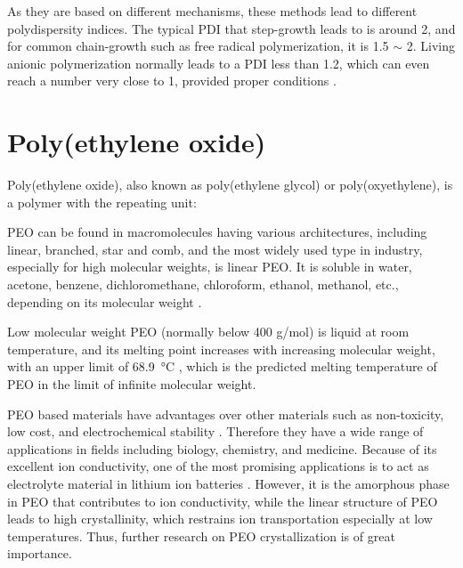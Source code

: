 As they are based on different mechanisms, these methods lead to different polydispersity indices. The typical PDI that step-growth leads to is around 2, and for common chain-growth such as free radical polymerization, it is 1.5 $\sim$ 2. Living anionic polymerization normally leads to a PDI less than 1.2, which can even reach a number very close to 1, provided proper conditions \cite{Dotson1995}.

\section{Poly(ethylene oxide)}

Poly(ethylene oxide), also known as poly(ethylene glycol) or poly(oxyethylene), is a polymer with the repeating unit:

\begin{center}
\def\setpolymerdelim#1#2{%
	\def\delimleft{#1}%
	\def\delimright{#2}%
}

\def\makebraces[#1,#2]#3#4#5{%
	\edef\delimhalfdim{\the\dimexpr(#1+#2)/2}%
	\edef\delimvshift{\the\dimexpr(#1-#2)/2}%
	\chemmove{%
		\node[at=(#4),yshift=(\delimvshift)]%
		{$\expandafter\left\delimleft\vrule height \delimhalfdim depth \delimhalfdim width 0pt\right.$};%
		\node[at=(#5),yshift=(\delimvshift)]%
		{$\left.\vrule height \delimhalfdim depth \delimhalfdim width 0pt \expandafter\right\delimright_{\rlap{#3}}$};%
	}%
}

\setpolymerdelim()

\makebraces[5pt,5pt]{\!\!N}{op}{cl}
\end{center}

PEO can be found in macromolecules having various architectures, including linear, branched, star and comb, and the most widely used type in industry, especially for high molecular weights, is linear PEO. It is soluble in water, acetone, benzene, dichloromethane, chloroform, ethanol, methanol, etc., depending on its molecular weight \cite{Brady2017}. 

Low molecular weight PEO (normally below 400 g/mol) is liquid at room temperature, and its melting point increases with increasing molecular weight, with an upper limit of \SI{68.9}{\celsius} \cite{Buckley1975}, which is the predicted melting temperature of PEO in the limit of infinite molecular weight.

PEO based materials have advantages over other materials such as non-toxicity, low cost, and electrochemical stability \cite{Xue2015}. Therefore they have a wide range of applications in fields including biology, chemistry, and medicine. Because of its excellent ion conductivity, one of the most promising applications is to act as electrolyte material in lithium ion batteries \cite{Croce1998}. However, it is the amorphous phase in PEO that contributes to ion conductivity, while the linear structure of PEO leads to high crystallinity, which restrains ion transportation especially at low temperatures. Thus, further research on PEO crystallization is of great importance.


